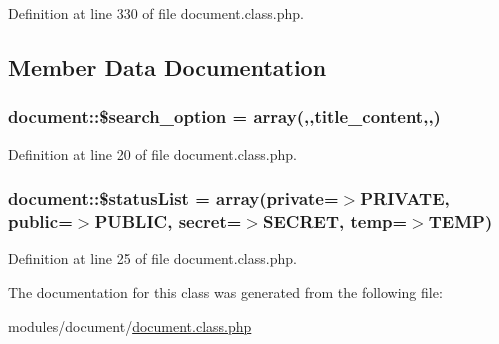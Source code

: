 Definition at line 330 of file document.\+class.\+php.



\subsection{Member Data Documentation}
\hypertarget{classdocument_adfef00d8f028ef4dfe991de199009d46}{}
\subsubsection[{\$search\+\_\+option}]{\setlength{\rightskip}{0pt plus 5cm}document\+::\$search\+\_\+option = array(\textquotesingle{},\textquotesingle{},\textquotesingle{}title\+\_\+content\textquotesingle{},\textquotesingle{},)}\label{classdocument_adfef00d8f028ef4dfe991de199009d46}


Definition at line 20 of file document.\+class.\+php.

\hypertarget{classdocument_a93e1c85a4ec17a1471b874fdb14cce58}{}
\subsubsection[{\$status\+List}]{\setlength{\rightskip}{0pt plus 5cm}document\+::\$status\+List = array(\textquotesingle{}private\textquotesingle{}=$>$\textquotesingle{}P\+R\+I\+V\+A\+T\+E\textquotesingle{}, \textquotesingle{}public\textquotesingle{}=$>$\textquotesingle{}P\+U\+B\+L\+I\+C\textquotesingle{}, \textquotesingle{}secret\textquotesingle{}=$>$\textquotesingle{}S\+E\+C\+R\+E\+T\textquotesingle{}, \textquotesingle{}temp\textquotesingle{}=$>$\textquotesingle{}T\+E\+M\+P\textquotesingle{})}\label{classdocument_a93e1c85a4ec17a1471b874fdb14cce58}


Definition at line 25 of file document.\+class.\+php.



The documentation for this class was generated from the following file\+:\begin{DoxyCompactItemize}
\item 
modules/document/\hyperlink{document_8class_8php}{document.\+class.\+php}\end{DoxyCompactItemize}
